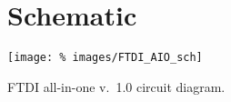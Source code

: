 \begin{landscape}
  \begin{figure}[p]
    \section{Schematic}
    \centering
    \texttt{[image: \%
      images/FTDI\_AIO\_sch]}
     \caption{FTDI all-in-one v.~1.0 circuit diagram.}
  \end{figure}
\end{landscape}
